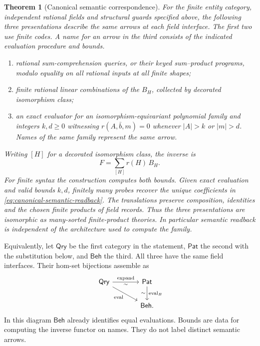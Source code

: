 \documentclass[11pt,a4paper]{article}
\newtheorem{theorem}{Theorem}[section]
\theoremstyle{definition}
\theoremstyle{remark}\newaliascnt{remark}{theorem}
\numberwithin{equation}{section}
\begin{document}
\begin{theorem}[Canonical semantic correspondence]\label{thm:support-readback}
For the finite entity category, independent rational fields and structural guards specified above, the following three presentations describe the same arrows at each field interface. The first two use finite codes. A name for an arrow in the third consists of the indicated evaluation procedure and bounds.
\begin{enumerate}
\item rational sum-comprehension queries, or their keyed sum--product programs, modulo equality on all rational inputs at all finite shapes;
\item finite rational linear combinations of the \(B_H\), collected by decorated isomorphism class;
\item an exact evaluator for an isomorphism-equivariant polynomial family and integers \(k,d\ge0\) witnessing \(r(A,\bar b,m)=0\) whenever \(|A|>k\) or \(|m|>d\). Names of the same family represent the same arrow.
\end{enumerate}
Writing $[H]$ for a decorated isomorphism class, the inverse is
\begin{equation}\label{eq:canonical-semantic-readback}
 F=\sum_{[H]} r(H)\,B_H .
\end{equation}
For finite syntax the construction computes both bounds. Given exact evaluation and valid bounds $k,d$, finitely many probes recover the unique coefficients in \eqref{eq:canonical-semantic-readback}. The translations preserve composition, identities and the chosen finite products of field records. Thus the three presentations are isomorphic as many-sorted finite-product theories. In particular semantic readback is independent of the architecture used to compute the family.
\end{theorem}
Equivalently, let \(\mathsf{Qry}\) be the first category in the statement, \(\mathsf{Pat}\) the second with the substitution below, and \(\mathsf{Beh}\) the third. All three have the same field interfaces. Their hom-set bijections assemble as
\[
\begin{tikzcd}[column sep=large]
 \mathsf{Qry}\arrow[r,"\mathrm{expand}","\sim"']\arrow[dr,"\mathrm{eval}"']&
 \mathsf{Pat}\arrow[d,"\mathrm{eval}_B","\sim"']\\
 &\mathsf{Beh}.
\end{tikzcd}
\]
In this diagram \(\mathsf{Beh}\) already identifies equal evaluations. Bounds are data for computing the inverse functor on names. They do not label distinct semantic arrows.
\end{document}
